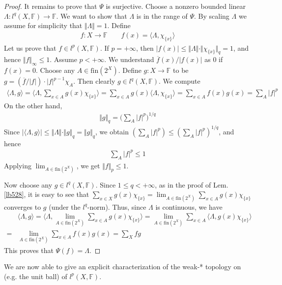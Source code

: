 \documentclass[12pt,b5paper,notitlepage]{article}
\theoremstyle{definition}
\theoremstyle{plain}
\newcommand{\ovl}{\overline}
\newcommand{\bk}[1]{\langle {#1}\rangle}
\newcommand{\bigbk}[1]{\big\langle {#1}\big\rangle}
\newcommand{\Bigbk}[1]{\Big\langle {#1}\Big\rangle}
\newcommand{\fin}{\mathrm{fin}}
\newcommand{\Fbb}{\mathbb F}
\numberwithin{equation}{section}
\begin{document}
\begin{proof}
It remains to prove that $\Psi$ is surjective. Choose a nonzero bounded linear $\Lambda:l^q(X,\Fbb)\rightarrow\Fbb$. We want to show that $\Lambda$ is in the range of $\Psi$. By scaling $\Lambda$ we assume for simplicity that $\Vert\Lambda\Vert=1$.  Define 
\begin{align}
f:X\rightarrow\Fbb\qquad  f(x)=\bk{\Lambda,\chi_{\{x\}}}
\end{align}
Let us prove that $f\in l^p(X,\Fbb)$. If $p=+\infty$, then $|f(x)|\leq \Vert\Lambda\Vert\cdot\Vert\chi_{\{x\}}\Vert_q=1$, and hence $\Vert f\Vert_\infty\leq 1$. Assume $p<+\infty$. We understand $\ovl f(x)/|f(x)|$ as $0$ if $f(x)=0$. Choose any $A\in\fin(2^X)$. Define $g:X\rightarrow\Fbb$ to be $g=(\ovl f/|f|)\cdot |f|^{p-1}\chi_A$. Then clearly $g\in l^q(X,\Fbb)$. We compute
\begin{align*}
\bk{\Lambda,g}=\bigbk{\Lambda,\sum_{x\in A}g(x)\chi_{\{x\}}}=\sum_{x\in A}g(x)\bk{\Lambda,\chi_{\{x\}}}=\sum_{x\in A}f(x)g(x)=\sum_A|f|^p
\end{align*}
On the other hand,
\begin{align*}
\Vert g\Vert_q=\Big(\sum_A|f|^p \Big)^{1/q}
\end{align*}
Since $|\bk{\Lambda,g}|\leq \Vert\Lambda\Vert\cdot\Vert g\Vert_q=\Vert g\Vert_q$, we obtain $(\sum_A|f|^p)\leq (\sum_A|f|^p)^{1/q}$, and hence 
\begin{align*}
\sum_A |f|^p\leq 1
\end{align*}
Applying $\lim_{A\in\fin(2^X)}$, we get $\Vert f\Vert_p\leq 1$.

Now choose any $g\in l^q(X,\Fbb)$. Since $1\leq q<+\infty$, as in the proof of Lem. \ref{lb528}, it is easy to see that $\sum_{x\in X}g(x)\chi_{\{x\}}=\lim_{A\in\fin(2^X)}\sum_{x\in A}g(x)\chi_{\{x\}}$ converges to $g$ (under the $l^q$-norm). Thus, since $\Lambda$ is continuous, we have
\begin{align*}
&\bk{\Lambda,g}=\Bigbk{\Lambda,\lim_{A\in\fin(2^X)}\sum_{x\in A}g(x)\chi_{\{x\}}}=\lim_{A\in\fin(2^X)}\sum_{x\in A}\Bigbk{\Lambda,g(x)\chi_{\{x\}}}\\
=&\lim_{A\in\fin(2^X)}\sum_{x\in A}f(x)g(x)=\sum_X fg
\end{align*}
This proves that $\Psi(f)=\Lambda$.
\end{proof}

We are now able to give an explicit characterization of the weak-* topology on  (e.g. the unit ball) of $l^p(X,\Fbb)$.
\end{document}
